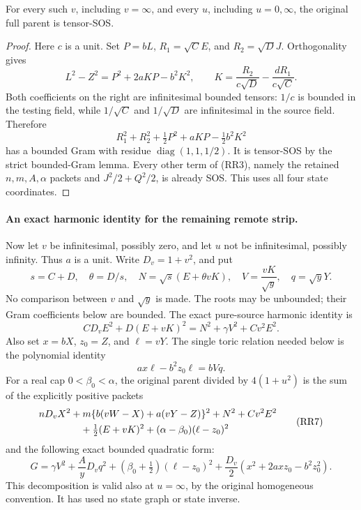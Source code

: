\begin{proposition}
For every such $v$, including $v=\infty$, and every $u$, including
$u=0,\infty$, the original full parent is tensor-SOS.
\end{proposition}
\begin{proof}
Here $c$ is a unit.  Set $P=bL$, $R_1=\sqrt C E$, and
$R_2=\sqrt D J$.  Orthogonality gives
\[
 L^2-Z^2=P^2+2aKP-b^2K^2,
 \qquad
 K=\frac{R_2}{c\sqrt D}-\frac{dR_1}{c\sqrt C}.            \tag{RR4}
\]
Both coefficients on the right are infinitesimal bounded tensors:
$1/c$ is bounded in the testing field, while $1/\sqrt C$ and
$1/\sqrt D$ are infinitesimal in the source field.  Therefore
\[
 R_1^2+R_2^2+\tfrac12P^2+aKP-\tfrac12b^2K^2
\]
has a bounded Gram with residue $\operatorname{diag}(1,1,1/2)$.
It is tensor-SOS by the strict bounded-Gram lemma.  Every other term
of (RR3), namely the retained $n,m,A,\alpha$ packets and
$J^2/2+Q^2/2$, is already SOS.  This uses all four state coordinates.
\end{proof}

\paragraph{An exact harmonic identity for the remaining remote strip.}
Now let $v$ be infinitesimal, possibly zero, and let $u$ not be
infinitesimal, possibly infinity.  Thus $a$ is a unit.
Write $D_v=1+v^2$, and put
\[
 s=C+D,\quad\theta=D/s,\quad
 N=\sqrt{s}(E+\theta vK),\quad
 V=\frac{vK}{\sqrt y},\quad q=\sqrt yY.
\]
No comparison between $v$ and $\sqrt y$ is made.  The roots may be
unbounded; their Gram coefficients below are bounded.  The exact
pure-source harmonic identity is
\[
 CD_vE^2+D(E+vK)^2=N^2+\gamma V^2+Cv^2E^2.               \tag{RR5}
\]
Also set $x=bX$, $z_0=Z$, and $\ell=vY$.  The single toric relation
needed below is the polynomial identity
\[
 a x\ell-b^2z_0\ell=bVq.                                \tag{RR6}
\]
For a real cap $0<\beta_0<\alpha$, the original parent divided
by $4(1+u^2)$ is the sum of the explicitly positive packets
\[
 \begin{split}
 &nD_vX^2+m\{b(vW-X)+a(vY-Z)\}^2+N^2+Cv^2E^2\\
 &\hspace{15mm}+\tfrac12(E+vK)^2+(\alpha-\beta_0)(\ell-z_0)^2
 \end{split}                                             \tag{RR7}
\]
and the following exact bounded quadratic form:
\[
 G=\gamma V^2+\frac AyD_vq^2
 +(\beta_0+\tfrac12)(\ell-z_0)^2
 +\frac{D_v}{2}(x^2+2axz_0-b^2z_0^2).                   \tag{RR8}
\]
This decomposition is valid also at $u=\infty$, by the original
homogeneous convention.  It has used no state graph or state inverse.

